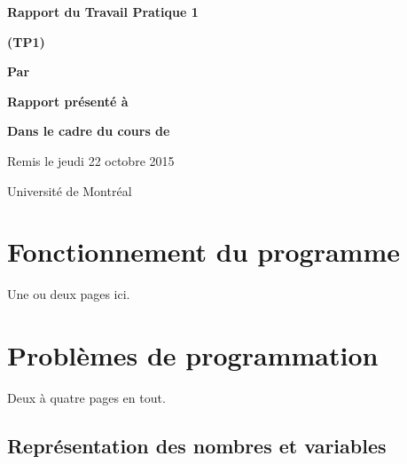 \documentclass[letterpaper,12pt]{scrartcl}
\begin{document}
	\begin{center}
		\vspace{2cm}

		{\Huge\bf\sf Rapport du Travail Pratique 1}

		\vspace{0.5cm}

		{\bf\sf (TP1)}

		\vspace{4cm}

		{\bf\sf Par}

		\vspace{0.5cm}{\large\bf\sf Sulliman Aïad et François Poitras}

		\vspace{2cm}

		{\bf\sf Rapport présenté à}

		\vspace{0.5cm}{\large\bf\sf M. Marc  Feeley}

		\vspace{2cm}

		{\bf\sf Dans le cadre du cours de}

		\vspace{0.5cm}{\large\bf\sf Concepts des langages de programmation (IFT2035)}

		\vspace{\fill}
		Remis le jeudi 22 octobre 2015

		\vspace{0.5cm}Université de Montréal
	\end{center}
	
	\newpage

	\pagestyle{cb}
	
	\tableofcontents

	\newpage
	
	\section{Fonctionnement du programme}
		 Une ou deux pages ici.
			
	
    
	\section{Problèmes de programmation}
        Deux à quatre pages en tout.
        
		\subsection{Représentation des nombres et variables}
            
\end{document}
